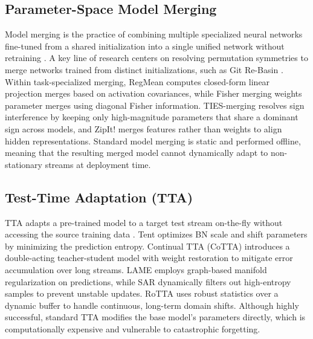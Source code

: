 \documentclass{article}
\theoremstyle{plain}
\theoremstyle{definition}
\theoremstyle{remark}
\begin{document}
\subsection{Parameter-Space Model Merging}
Model merging is the practice of combining multiple specialized neural networks fine-tuned from a shared initialization into a single unified network without retraining \cite{wortsman2022model, ilharco2022editing, matena2022merging}. A key line of research centers on resolving permutation symmetries to merge networks trained from distinct initializations, such as Git Re-Basin \cite{ainsworth2022git, entezari2021role}. Within task-specialized merging, RegMean \cite{regmean2023yang} computes closed-form linear projection merges based on activation covariances, while Fisher merging \cite{matena2022merging} weights parameter merges using diagonal Fisher information. TIES-merging \cite{ties2023yadav} resolves sign interference by keeping only high-magnitude parameters that share a dominant sign across models, and ZipIt! \cite{zipit2023stoica} merges features rather than weights to align hidden representations. Standard model merging is static and performed offline, meaning that the resulting merged model cannot dynamically adapt to non-stationary streams at deployment time.

\subsection{Test-Time Adaptation (TTA)}
TTA adapts a pre-trained model to a target test stream on-the-fly without accessing the source training data \cite{wang2020tent, wang2022cotta, niu2022sar}. Tent \cite{wang2020tent} optimizes BN scale and shift parameters by minimizing the prediction entropy. Continual TTA (CoTTA) \cite{wang2022cotta} introduces a double-acting teacher-student model with weight restoration to mitigate error accumulation over long streams. LAME \cite{boudiaf2022lame} employs graph-based manifold regularization on predictions, while SAR \cite{niu2022sar} dynamically filters out high-entropy samples to prevent unstable updates. RoTTA \cite{yuan2023rotta} uses robust statistics over a dynamic buffer to handle continuous, long-term domain shifts. Although highly successful, standard TTA modifies the base model's parameters directly, which is computationally expensive and vulnerable to catastrophic forgetting.
\end{document}
